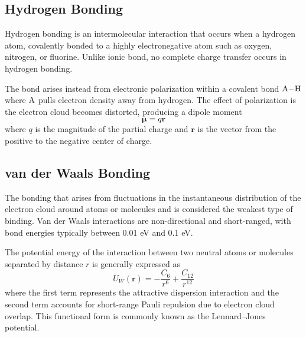 \documentclass[../../../main.tex]{subfiles}
\begin{document}
\subsection{Hydrogen Bonding}
Hydrogen bonding is an intermolecular interaction that occurs when a hydrogen atom, covalently bonded to a highly electronegative atom such as oxygen, nitrogen, or fluorine.
Unlike ionic bond, no complete charge transfer occurs in hydrogen bonding.

The bond arises instead from electronic polarization within a covalent bond $\ce{A-H}$ where $\ce{A}$ pulls electron density away from hydrogen.
The effect of polarization is the electron cloud becomes distorted, producing a dipole moment
\begin{equation*}
    \mathbf{\mu}=q \mathbf{r}
\end{equation*}
where $q$ is the magnitude of the partial charge and $\mathbf{r}$ is the vector from the positive to the negative center of charge.

\subsection{van der Waals Bonding}
The bonding that arises from fluctuations in the instantaneous distribution of the electron cloud around atoms or molecules and is considered the weakest type of binding.
Van der Waals interactions are non-directional and short-ranged, with bond energies typically between 0.01 eV and 0.1 eV.

The potential energy of the interaction between two neutral atoms or molecules separated by distance $r$ is generally expressed as
\begin{equation*}
    U_W(\mathbf{r})=- \frac{C_6}{r^6}+\frac{C_{12}}{r^{12}}
\end{equation*}
where the first term represents the attractive dispersion interaction and the second term accounts for short-range Pauli repulsion due to electron cloud overlap. 
This functional form is commonly known as the Lennard–Jones potential.
\end{document}
